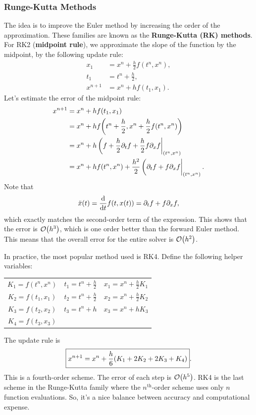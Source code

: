 \documentclass[12pt,letterpaper]{article}
\begin{document}
\subsubsection{Runge-Kutta Methods}
The idea is to improve the Euler method by increasing the order of the approximation. These families are known as the \textbf{Runge-Kutta (RK) methods}. For RK2 (\textbf{midpoint rule}), we approximate the slope of the function by the midpoint, by the following update rule:
\begin{align*}
    x_1&=x^n+\frac h2f(t^n,x^n),\\
    t_1&=t^n+\frac h2,\\
    x^{n+1}&=x^n+hf(t_1,x_1).
\end{align*}
Let's estimate the error of the midpoint rule:
\begin{align*}
    x^{n+1}&=x^n+hf(t_1,x_1)\\
    &=x^n+hf\qty(t^n+\frac h2,x^n+\frac h2f(t^n,x^n))\\
    &=x^n+h\eval(f+\frac h2\partial_tf+\frac h2f\partial_xf|_{(t^n,x^n)}\\
    &=x^n+hf(t^n,x^n)+\frac{h^2}{2}\eval(\partial_tf+f\partial_xf|_{(t^n,x^n)}.
\end{align*}
Note that
\[\ddot{x}(t)=\dv{t}f(t,x(t))=\partial_tf+f\partial_xf,\]
which exactly matches the second-order term of the expression. This shows that the error is $\order{h^3}$, which is one order better than the forward Euler method. This means that the overall error for the entire solver is $\order{h^2}$.

In practice, the most popular method used is RK4. Define the following helper variables:
\begin{center}
    \begin{tabular}{ccc}
        $K_1=f(t^n,x^n)$ & $t_1=t^n+\frac h2$ & $x_1=x^n+\frac h2K_1$ \\
        $K_2=f(t_1,x_1)$ & $t_2=t^n+\frac h2$ & $x_2=x^n+\frac h2K_2$ \\
        $K_3=f(t_2,x_2)$ & $t_3=t^n+h$ & $x_3=x^n+hK_3$ \\
        $K_4=f(t_3,x_3)$&&
    \end{tabular}
\end{center}
The update rule is
\[\boxed{x^{n+1}=x^n+\frac h6\qty(K_1+2K_2+2K_3+K_4)}.\]
This is a fourth-order scheme. The error of each step is $\order{h^5}$. RK4 is the last scheme in the Runge-Kutta family where the $n^{\text{th}}$-order scheme uses only $n$ function evaluations. So, it's a nice balance between accuracy and computational expense.
\end{document}
